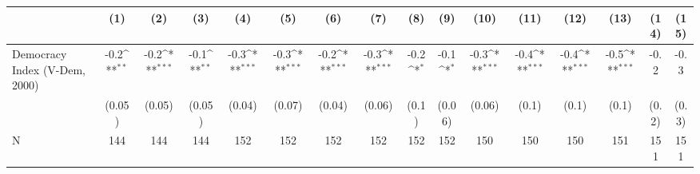 {
\def\sym#1{\ifmmode^{#1}\else\(^{#1}\)\fi}
\begin{tabular}{l*{15}{c}}
\hline\hline
                    &\multicolumn{1}{c}{(1)}         &\multicolumn{1}{c}{(2)}         &\multicolumn{1}{c}{(3)}         &\multicolumn{1}{c}{(4)}         &\multicolumn{1}{c}{(5)}         &\multicolumn{1}{c}{(6)}         &\multicolumn{1}{c}{(7)}         &\multicolumn{1}{c}{(8)}         &\multicolumn{1}{c}{(9)}         &\multicolumn{1}{c}{(10)}         &\multicolumn{1}{c}{(11)}         &\multicolumn{1}{c}{(12)}         &\multicolumn{1}{c}{(13)}         &\multicolumn{1}{c}{(14)}         &\multicolumn{1}{c}{(15)}         \\
\hline
Democracy Index (V-Dem, 2000)&        -0.2\sym{**} &        -0.2\sym{***}&        -0.1\sym{**} &        -0.3\sym{***}&        -0.3\sym{***}&        -0.2\sym{***}&        -0.3\sym{***}&        -0.2\sym{*}  &        -0.1\sym{*}  &        -0.3\sym{***}&        -0.4\sym{***}&        -0.4\sym{***}&        -0.5\sym{***}&        -0.2         &        -0.3         \\
                    &      (0.05)         &      (0.05)         &      (0.05)         &      (0.04)         &      (0.07)         &      (0.04)         &      (0.06)         &       (0.1)         &      (0.06)         &      (0.06)         &       (0.1)         &       (0.1)         &       (0.1)         &       (0.2)         &       (0.3)         \\
\hline
N                   &         144         &         144         &         144         &         152         &         152         &         152         &         152         &         152         &         152         &         150         &         150         &         150         &         151         &         151         &         151         \\
\hline\hline
\end{tabular}
}
